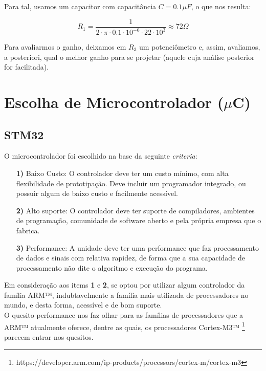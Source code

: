 \documentclass[10pt,a4paper]{report}
\begin{document}
	
	Para tal, usamos um capacitor com capacitância $C = 0.1\mu{F}$, o que nos resulta:
	
	\begin{equation}
	R_1 = \frac{1}{2\cdot{\pi}\cdot{0.1}\cdot{10^{-6}}\cdot{22}\cdot{10^3}} \approx 72\Omega 
	\end{equation}
	
	Para avaliarmos o ganho, deixamos em $R_3$ um potenciômetro e, assim, avaliamos, a posteriori, qual o melhor ganho para se projetar (aquele cuja análise posterior for facilitada).


\section{Escolha de Microcontrolador ($\mu$C)}
	\subsection{STM32}
	O microcontrolador foi escolhido na base da seguinte {\it criteria}:
	
	\begin{itemize}
		\item[{\bf 1)}]Baixo Custo: O controlador deve ter um custo mínimo, com alta flexibilidade de prototipação. Deve incluir um programador integrado, ou possuir algum de baixo custo e facilmente acessível.
		
		\item[{\bf 2)}] Alto suporte: O controlador deve ter suporte de compiladores, ambientes de programação, comunidade de software aberto e pela própria empresa que o fabrica.
		
		\item[{\bf 3)}] Performance: A unidade deve ter uma performance que faz processamento de dados e sinais com relativa rapidez, de forma que a sua capacidade de processamento não dite o algoritmo e execução do programa.
	
	\end{itemize}

	Em consideração aos items {\bf 1} e {\bf 2}, se optou por utilizar algum controlador da família ARM™, indubtavelmente a família mais utilizada de processadores no mundo, e desta forma, acessível e de bom suporte. \\
	
	O quesito performance nos faz olhar para as famílias de processadores que a ARM™ atualmente oferece, dentre as quais, os processadores Cortex-M3™ \footnote{https://developer.arm.com/ip-products/processors/cortex-m/cortex-m3} parecem entrar nos quesitos. \\
	
\end{document}
